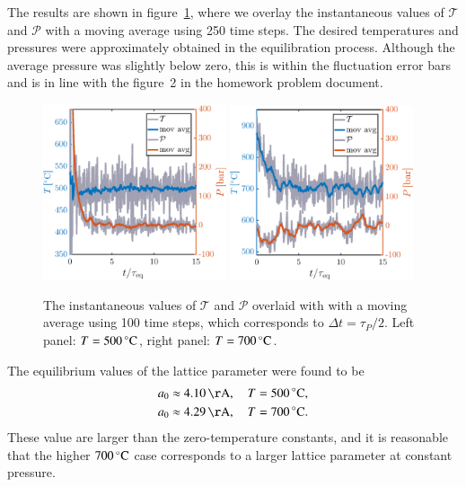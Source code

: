 The results are shown in figure~\ref{fig:eq}, where we overlay the instantaneous values of $\mathcal{T}$ and $\mathcal{P}$ with a moving average using 250 time steps. The desired temperatures and pressures were approximately obtained in the equilibration process. Although  the average pressure was slightly below zero, this is within the fluctuation error bars and is in line with the figure~2 in the homework problem document. 
\begin{figure}[!ht]
\begin{center}
  \includegraphics[width=0.48\textwidth]{../figures/TP-eq-500} 
    \includegraphics[width=0.48\textwidth]{../figures/TP-eq-700} 
  \caption{The instantaneous values of $\mathcal{T}$ and $\mathcal{P}$ overlaid with with a moving average using 100 time steps, which corresponds to $\Delta t = \tau_P/2$. Left panel: $T=\unit[500]{^\circ C}$,  right panel: $T=\unit[700]{^\circ C}$.}
  \label{fig:eq}
\end{center}
\end{figure}
The equilibrium values of the lattice parameter were found to be 
\begin{align}
a_0 &\approx \unit[4.10]{\AA}, \quad T=\unit[500]{^\circ C}, \\
a_0 &\approx \unit[4.29]{\AA}, \quad T=\unit[700]{^\circ C} .
\end{align} 
These value are larger than the zero-temperature constants, and it is reasonable that the higher $\unit[700]{^\circ C}$ case corresponds to a larger lattice parameter at constant pressure. 

